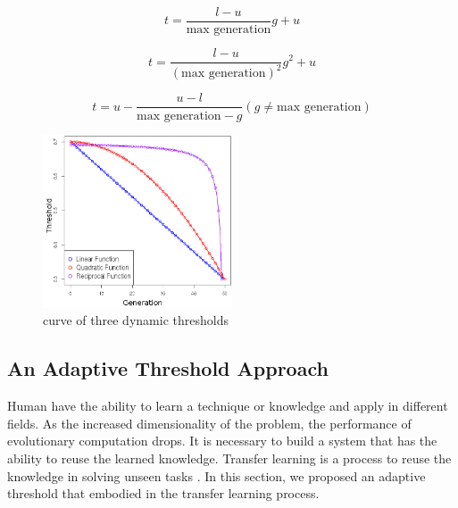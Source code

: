 \begin{equation}
\label{eq:linear}
 t = \frac{l - u}{\text{max generation}} g + u
\end{equation}

\begin{equation}
\label{eq:quadratic}
 t = \frac{l - u}{(\text{max generation})^2} g^2 + u
\end{equation}

\begin{equation}
\label{eq:reciprocal}
 t = u - \frac{u - l}{\text{max generation} - g}  (g \neq \text{max generation})
\end{equation}


% 
% 
\begin{figure}[H]
\centering
  \includegraphics[width=0.5\textwidth]{pics/dynamic.png}
  \caption{curve of three dynamic thresholds}
  \label{fig:dynamic}
\end{figure}
% 
\subsection{An Adaptive Threshold Approach}
\label{sec:transfer}
Human have the ability to learn a technique or knowledge and apply in different fields. 
As the increased dimensionality of the problem, the performance of evolutionary computation drops. 
It is necessary to build a system that has the ability to reuse the learned knowledge. 
Transfer learning is a process to reuse the knowledge in solving unseen tasks \cite{olivas}. 
In this section, we proposed an adaptive threshold that embodied in the transfer learning process.


